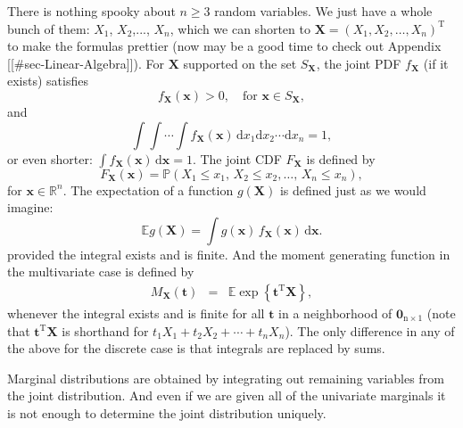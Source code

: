 There is nothing spooky about \(n\geq3\) random variables. We just
have a whole bunch of them: \(X_{1}\), \(X_{2}\),..., \(X_{n}\), which
we can shorten to
\(\mathbf{X}=(X_{1},X_{2},\ldots,X_{n})^{\mathrm{T}}\) to make the
formulas prettier (now may be a good time to check out Appendix
[[#sec-Linear-Algebra]]). For \(\mathbf{X}\) supported on the set
\(S_{\mathbf{X}}\), the joint PDF \(f_{\mathbf{X}}\) (if it exists)
satisfies
\begin{equation}
f_{\mathbf{X}}(\mathbf{x})>0,\quad \mbox{for }\mathbf{x}\in S_{\mathbf{X}},
\end{equation}
and
\begin{equation}
\int\!\!\!\int\cdots\int f_{\mathbf{X}}(\mathbf{x})\,\mathrm{d} x_{1}\mathrm{d} x_{2}\cdots\mathrm{d} x_{n}=1,
\end{equation}
or even shorter: \(\int
f_{\mathbf{X}}(\mathbf{x})\,\mathrm{d}\mathbf{x}=1\). The joint CDF
\(F_{\mathbf{X}}\) is defined by
\begin{equation}
F_{\mathbf{X}}(\mathbf{x})=\mathbb{P}(X_{1}\leq x_{1},\, X_{2}\leq x_{2},\ldots,\, X_{n}\leq x_{n}),
\end{equation}
for \(\mathbf{x}\in\mathbb{R}^{n}\). The expectation of a function
\(g(\mathbf{X})\) is defined just as we would imagine:
\begin{equation}
\mathbb{E} g(\mathbf{X})=\int g(\mathbf{x})\, f_{\mathbf{X}}(\mathbf{x})\,\mathrm{d}\mathbf{x}.
\end{equation}
provided the integral exists and is finite. And the moment generating
function in the multivariate case is defined by
\begin{eqnarray} 
M_{\mathbf{X}}(\mathbf{t}) & = & \mathbb{E}\exp\left\{ \mathbf{t}^{\mathrm{T}}\mathbf{X}\right\},
\end{eqnarray}
whenever the integral exists and is finite for all \(\mathbf{t}\) in a
neighborhood of \(\mathbf{0}_{\mathrm{n}\times1}\) (note that
\(\mathbf{t}^{\mathrm{T}}\mathbf{X}\) is shorthand for
\(t_{1}X_{1}+t_{2}X_{2}+\cdots+t_{n}X_{n}\)). The only difference in
any of the above for the discrete case is that integrals are replaced
by sums.

Marginal distributions are obtained by integrating out remaining
variables from the joint distribution. And even if we are given all of
the univariate marginals it is not enough to determine the joint
distribution uniquely.

